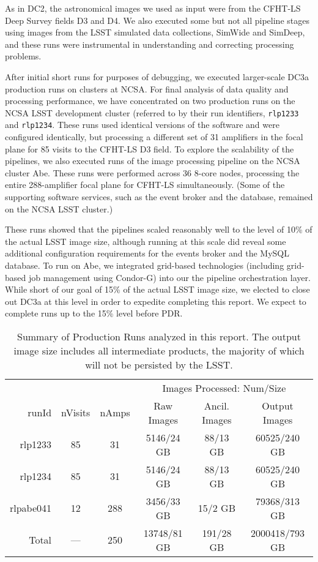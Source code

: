 As in DC2, the astronomical images we used as input were from the CFHT-LS
Deep Survey fields D3 and D4.  We also executed some but not all pipeline 
stages using images from the LSST simulated data collections, SimWide and
SimDeep, and these runs were instrumental in understanding and
correcting processing problems.

After initial short runs for purposes of debugging, 
we executed larger-scale DC3a production runs on clusters at
NCSA.  For final analysis of data quality and processing performance,
we have concentrated on two production runs on the NCSA LSST
development cluster (referred to by their run
identifiers, \texttt{rlp1233} and \texttt{rlp1234}. These runs used
identical versions of the software and were configured identically, but
processing a different set of 31 amplifiers in the focal plane for 85
visits to the CFHT-LS D3 field.  To explore the scalability of
the pipelines, we also executed runs of the image processing pipeline
on the NCSA cluster Abe.  These runs were performed across 36 8-core
nodes, processing the entire 288-amplifier focal plane for CFHT-LS
simultaneously.  (Some of the supporting software services, such as
the event broker and the database, remained on the NCSA LSST cluster.)

These runs showed that the pipelines scaled reasonably well to the
level of 10\% of the actual LSST image size, although running at this scale did reveal some additional
configuration requirements for the events broker and the MySQL
database.  To run on Abe, we integrated grid-based technologies
(including grid-based job management using Condor-G) into our the
pipeline orchestration layer.  While short of our goal of 15\% of the actual LSST image size,
we elected to close out DC3a at this level in order to expedite completing this report.
We expect to complete runs up to the 15\% level before PDR.

\begin{table}[ht]
\centering
\caption{Summary of Production Runs analyzed in this report.  The
output image size includes all intermediate products, the majority of
which will not be persisted by the LSST.
\label{ex:tbl:runsummary}}
\vspace{\baselineskip}
\begin{tabular}{rccccc}
\hline\hline
          &         &       & \multicolumn{3}{c}{Images Processed: Num/Size} \\
runId     & nVisits & nAmps & Raw Images & Ancil. Images & Output Images \\ \hline
rlp1233   & 85      & 31  & 5146/24 GB    & 88/13 GB       & 60525/240 GB \\ 
rlp1234   & 85      & 31  & 5146/24 GB    & 88/13 GB       & 60525/240 GB \\ 
rlpabe041 & 12      & 288 & 3456/33 GB    & 15/2 GB        & 79368/313 GB \\ \hline
Total     & ---     & 250 & 13748/81 GB   & 191/28 GB      & 2000418/793 GB \\ \hline
\end{tabular}

\end{table}

